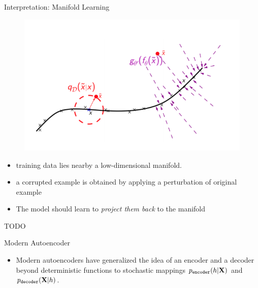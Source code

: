 \documentclass[xcolor=pdftex,dvipsnames,table,mathserif]{beamer}
\begin{document}
\begin{frame}{Interpretation: Manifold Learning}
\begin{figure}
\includegraphics[width=.5\columnwidth]{../graphics/Manifold}
\end{figure}
\begin{itemize}
\item training data lies nearby a low-dimensional manifold.
\item a corrupted example is obtained by applying a perturbation of original example
\item The model should learn to \emph{project them back} to the manifold
\end{itemize}
TODO
\end{frame}


\begin{frame}{Modern Autoencoder}
\begin{itemize}
\item Modern autoencoders have generalized the idea of an encoder and a decoder
beyond deterministic functions to stochastic mappings
$p_{\texttt{encoder}}(h|\mathbf{X})$ and $p_{\texttt{decoder}}(\mathbf{X}|h)$.
\end{itemize}
\end{frame}
\end{document}
